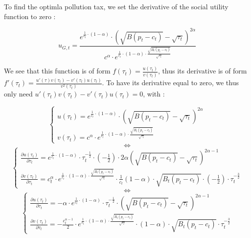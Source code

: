 \documentclass{article}
\begin{document}
To find the optimla pollution tax, we set the derivative of the social utility function to zero : 

$$u_{G,t}=\frac{e^{\frac{1}{c_{t}}\cdot\left(1-\alpha\right)}\cdot\left(\sqrt{B(p_{t}-c_{t})}-\sqrt{\tau_{t}}\right)^{2\alpha}}{c^{\alpha}\cdot e^{\frac{1}{c_{t}}\cdot(1-\alpha)\cdot\frac{\sqrt{B_{t}(p_{t}-c_{t})}}{\sqrt{\tau_{t}}}}}$$

We see that this function is of form $f(\tau_{t})=\frac{u(\tau_{t})}{v(\tau_{t})}$, thus its derivative is of form $f'(\tau_{t})=\frac{u'(\tau)v(\tau_{t})-v'(\tau_{t})u(\tau_{t})}{v^2(\tau_{t})}$. To have its derivative equal to zero, we thus only need $u'(\tau_{t})v(\tau_{t})-v'(\tau_{t})u(\tau_{t})=0$, with :

\begin{equation*}
    \begin{cases}
        u(\tau_{t})= e^{\frac{1}{c_{t}}\cdot\left(1-\alpha\right)}\cdot\left(\sqrt{B(p_{t}-c_{t})}-\sqrt{\tau_{t}}\right)^{2\alpha} \\
        v(\tau_{t})= c^{\alpha}\cdot e^{\frac{1}{c_{t}}\cdot(1-\alpha)\cdot\frac{\sqrt{B_{t}(p_{t}-c_{t})}}{\sqrt{\tau_{t}}}}
    \end{cases}
\end{equation*}
$$\iff$$
\begin{equation*}
    \begin{cases}
        \frac{\partial u(\tau_{t})}{\partial \tau_{t}}= e^{\frac{1}{c_{t}}\cdot\left(1-\alpha\right)}\cdot \tau_{t}^{-\frac{1}{2}}\cdot \left(-\frac{1}{2}\right)\cdot 2\alpha \left(\sqrt{B(p_{t}-c_{t})}-\sqrt{\tau_{t}}\right)^{2\alpha-1} \\
        \frac{\partial v(\tau_{t})}{\partial \tau_{t}}= c_{t}^{\alpha}\cdot e^{\frac{1}{c_{t}}\cdot(1-\alpha)\cdot\frac{\sqrt{B_{t}(p_{t}-c_{t})}}{\sqrt{\tau_{t}}}}\cdot \frac{1}{c_{t}}(1-\alpha)\cdot\sqrt{B_{t}(p_{t}-c_{t})}\cdot\left(-\frac{1}{2}\right)\cdot\tau_{t}^{-\frac{3}{2}}
    \end{cases}
\end{equation*}
$$\iff$$
\begin{equation*}
    \begin{cases}
        \frac{\partial u(\tau_{t})}{\partial \tau_{t}}= -\alpha\cdot e^{\frac{1}{c_{t}}\cdot\left(1-\alpha\right)}\cdot \tau_{t}^{-\frac{1}{2}}\cdot \left(\sqrt{B(p_{t}-c_{t})}-\sqrt{\tau_{t}}\right)^{2\alpha-1} \\
        \frac{\partial v(\tau_{t})}{\partial \tau_{t}}= -\frac{c_{t}^{\alpha-1}}{2}\cdot e^{\frac{1}{c_{t}}\cdot(1-\alpha)\cdot\frac{\sqrt{B_{t}(p_{t}-c_{t})}}{\sqrt{\tau_{t}}}}\cdot (1-\alpha)\cdot\sqrt{B_{t}(p_{t}-c_{t})}\cdot\tau_{t}^{-\frac{3}{2}}
    \end{cases}
\end{equation*}
\end{document}
